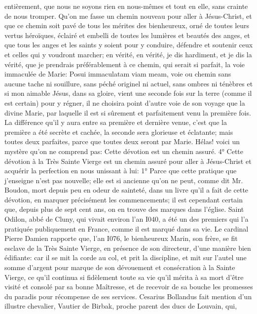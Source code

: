 entièrement, que nous ne soyons rien en nous-mêmes et tout en elle, sans crainte de nous tromper.
 Qu'on me fasse un chemin nouveau pour aller à Jésus-Christ, et que ce chemin soit pavé de tous les mérites
des bienheureux, orné de toutes leurs vertus héroïques, éclairé et embelli de toutes les lumières et beautés des
anges, et que tous les anges et les saints y soient pour y conduire, défendre et soutenir ceux et celles qui y
voudront marcher; en vérité, en vérité, je dis hardiment, et je dis la vérité, que je prendrais préférablement à ce
chemin, qui serait si parfait, la voie immaculée de Marie: Posui immaculatam viam meam, voie ou chemin sans
aucune tache ni souillure, sans péché originel ni actuel, sans ombres ni ténèbres et si mon aimable Jésus, dans sa
gloire, vient une seconde fois sur la terre (comme il est certain) pour y régner, il ne choisira point d'autre voie de
son voyage que la divine Marie, par laquelle il est si sûrement et parfaitement venu la première fois. La différence
qu'il y aura entre sa première et dernière venue, c'est que la première a été secrète et cachée, la seconde sera
glorieuse et éclatante; mais toutes deux parfaites, parce que toutes deux seront par Marie. Hélas! voici un mystère
qu'on ne comprend pas: 
Cette dévotion est un chemin assuré.
 4° Cette dévotion à la Très Sainte Vierge est un chemin assuré pour aller à Jésus-Christ et acquérir la
perfection en nous unissant à lui:
1° Parce que cette pratique que j'enseigne n'est pas nouvelle; elle est si ancienne qu'on ne peut, comme dit Mr.
Boudon, mort depuis peu en odeur de sainteté, dans un livre qu'il a fait de cette dévotion, en marquer précisément
les commencements; il est cependant certain que, depuis plus de sept cent ans, on en trouve des marques dans
l'église.
Saint Odilon, abbé de Cluny, qui vivait environ l'an I040, a été un des premiers qui l'a pratiquée publiquement en
France, comme il est marqué dans sa vie.
Le cardinal Pierre Damien rapporte que, l'an I076, le bienheureux Marin, son frère, se fit esclave de la Très Sainte
Vierge, en présence de son directeur, d'une manière bien édifiante: car il se mit la corde au col, et prit la discipline,
et mit sur l'autel une somme d'argent pour marque de son dévouement et consécration à la Sainte Vierge, ce qu'il
continua si fidèlement toute sa vie qu'il mérita à sa mort d'être visité et consolé par sa bonne Maîtresse, et de
recevoir de sa bouche les promesses du paradis pour récompense de ses services.
Cesarius Bollandus fait mention d'un illustre chevalier, Vautier de Birbak, proche parent des ducs de Louvain, qui,
